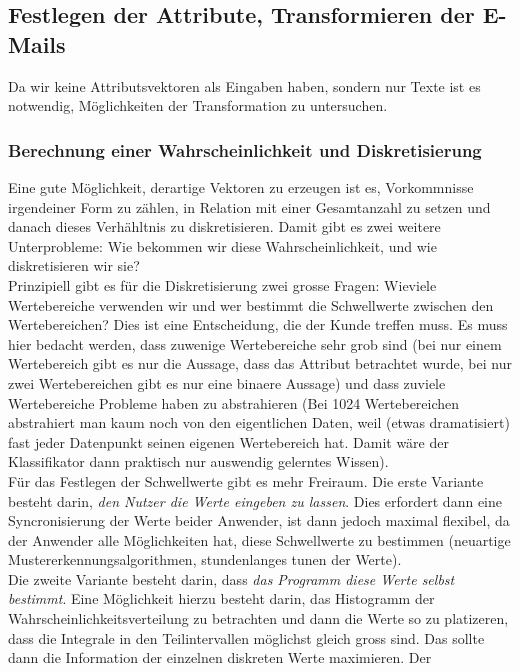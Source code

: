 \documentclass{article}
\theoremstyle{definition}
\theoremstyle{remark}
\begin{document}
\subsection{Festlegen der Attribute, Transformieren der E-Mails}
Da wir keine Attributsvektoren als Eingaben haben, sondern nur Texte ist es
notwendig, M\"oglichkeiten der Transformation zu untersuchen. 

\subsubsection{Berechnung einer Wahrscheinlichkeit und Diskretisierung}
Eine gute M\"oglichkeit, derartige Vektoren zu erzeugen ist es, Vorkommnisse
irgendeiner Form zu z\"ahlen, in Relation mit einer Gesamtanzahl zu setzen und 
danach dieses Verh\"ahltnis zu diskretisieren. Damit gibt es zwei weitere 
Unterprobleme: Wie bekommen wir diese Wahrscheinlichkeit, und wie diskretisieren
wir sie?\\
Prinzipiell gibt es f\"ur die Diskretisierung zwei grosse Fragen: Wieviele 
Wertebereiche verwenden wir und wer bestimmt die Schwellwerte zwischen den
Wertebereichen? Dies ist eine Entscheidung, die der Kunde treffen muss. Es muss
hier bedacht werden, dass zuwenige Wertebereiche sehr grob sind (bei 
nur einem Wertebereich gibt es nur die Aussage, dass das Attribut betrachtet
wurde, bei nur zwei Wertebereichen gibt es nur eine binaere Aussage) und dass
zuviele Wertebereiche Probleme haben zu abstrahieren (Bei
1024 Wertebereichen abstrahiert man kaum noch von den eigentlichen
Daten, weil (etwas dramatisiert) fast jeder Datenpunkt seinen 
eigenen Wertebereich hat. Damit w\"are der Klassifikator dann praktisch
nur auswendig gelerntes Wissen).\\
F\"ur das Festlegen der Schwellwerte gibt es mehr Freiraum. Die erste Variante
besteht darin, {\em den Nutzer die Werte eingeben zu lassen}. Dies erfordert dann
eine Syncronisierung der Werte beider Anwender, ist dann jedoch maximal
flexibel, da der Anwender alle M\"oglichkeiten hat, diese Schwellwerte zu 
bestimmen (neuartige Mustererkennungsalgorithmen, stundenlanges tunen der
Werte).\\
Die zweite Variante besteht darin, dass {\em das Programm diese Werte selbst 
bestimmt}. Eine M\"oglichkeit hierzu besteht darin, das Histogramm der 
Wahrscheinlichkeitsverteilung zu betrachten und dann die Werte so zu platizeren,
dass die Integrale in den Teilintervallen m\"oglichst gleich gross sind. Das
sollte dann die Information der einzelnen diskreten Werte maximieren. Der
\end{document}

